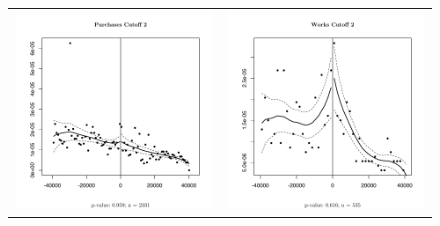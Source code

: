 \documentclass[11pt]{article}
\begin{document}
\begin{figure}[!htbp]
\begin{tabular}{cc}
  \includegraphics[scale = .45]{../plots/purchasesmanipulation2.pdf} &
  \includegraphics[scale = .45]{../plots/worksmanipulation2.pdf} \\

\end{tabular}
\end{figure}
\end{document}
